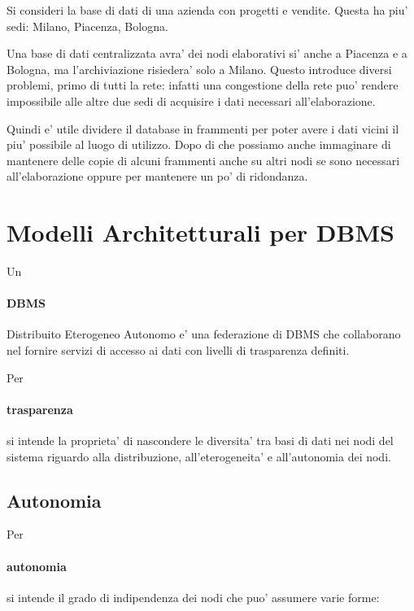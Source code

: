 Si consideri la base di dati di una azienda con progetti e vendite. Questa ha piu' sedi: Milano, Piacenza, Bologna.


Una base di dati centralizzata avra' dei nodi elaborativi si' anche a Piacenza e a Bologna, ma l'archiviazione risiedera' solo a Milano.
Questo introduce diversi problemi, primo di tutti la rete: infatti una congestione della rete puo' rendere impossibile alle altre due sedi di acquisire i dati necessari all'elaborazione.


Quindi e' utile dividere il database in frammenti per poter avere i dati vicini il piu' possibile al luogo di utilizzo.
Dopo di che possiamo anche immaginare di mantenere delle copie di alcuni frammenti anche su altri nodi se sono necessari all'elaborazione oppure per mantenere un po' di ridondanza.


\section{Modelli Architetturali per DBMS}

Un \paragraph{DBMS} Distribuito Eterogeneo Autonomo e' una federazione di DBMS che collaborano nel fornire servizi di accesso ai dati con livelli di trasparenza definiti.


Per \paragraph{trasparenza} si intende la proprieta' di nascondere le diversita' tra basi di dati nei nodi del sistema riguardo alla distribuzione, all'eterogeneita' e all'autonomia dei nodi.

\subsection{Autonomia}

Per \paragraph{autonomia} si intende il grado di indipendenza dei nodi che puo' assumere varie forme:

